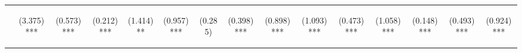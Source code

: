 \begin{center}
\begin{tabular}{lcccccccccccccc}
\hline  & \begin{normalsize}(3.375)***\end{normalsize} & \begin{normalsize}(0.573)***\end{normalsize} & \begin{normalsize}(0.212)***\end{normalsize} & \begin{normalsize}(1.414)**\end{normalsize} & \begin{normalsize}(0.957)***\end{normalsize} & \begin{normalsize}(0.285)\end{normalsize} & \begin{normalsize}(0.398)***\end{normalsize} & \begin{normalsize}(0.898)***\end{normalsize} & \begin{normalsize}(1.093)***\end{normalsize} & \begin{normalsize}(0.473)***\end{normalsize} & \begin{normalsize}(1.058)***\end{normalsize} & \begin{normalsize}(0.148)***\end{normalsize} & \begin{normalsize}(0.493)***\end{normalsize} & \begin{normalsize}(0.924)***\end{normalsize}\\

\end{tabular}
\end{center}
